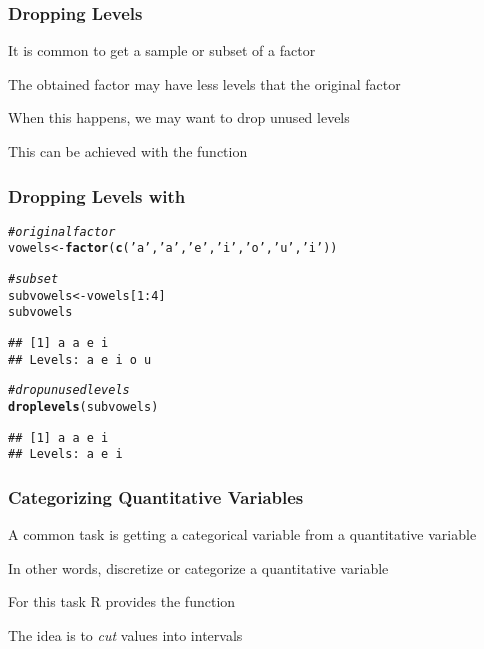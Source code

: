\documentclass[12pt]{beamer}\usepackage[]{graphicx}\usepackage[]{color}
\makeatletter
\newcommand{\hlnum}[1]{\textcolor[rgb]{0.686,0.059,0.569}{#1}}%
\newcommand{\hlstr}[1]{\textcolor[rgb]{0.192,0.494,0.8}{#1}}%
\newcommand{\hlcom}[1]{\textcolor[rgb]{0.678,0.584,0.686}{\textit{#1}}}%
\newcommand{\hlopt}[1]{\textcolor[rgb]{0,0,0}{#1}}%
\newcommand{\hlstd}[1]{\textcolor[rgb]{0.345,0.345,0.345}{#1}}%
\newcommand{\hlkwb}[1]{\textcolor[rgb]{0.69,0.353,0.396}{#1}}%
\newcommand{\hlkwd}[1]{\textcolor[rgb]{0.737,0.353,0.396}{\textbf{#1}}}%
\newenvironment{kframe}{%
 \def\at@end@of@kframe{}%
 \ifinner\ifhmode%
  \def\at@end@of@kframe{\end{minipage}}%
  \begin{minipage}{\columnwidth}%
 \fi\fi%
 \def\FrameCommand##1{\hskip\@totalleftmargin \hskip-\fboxsep
 \colorbox{shadecolor}{##1}\hskip-\fboxsep
     \hskip-\linewidth \hskip-\@totalleftmargin \hskip\columnwidth}%
 \MakeFramed {\advance\hsize-\width
   \@totalleftmargin\z@ \linewidth\hsize
   \@setminipage}}%
 {\par\unskip\endMakeFramed%
 \at@end@of@kframe}
\newenvironment{knitrout}{}{} %
\makeatother
\begin{document}

\begin{frame}[fragile]
\frametitle{Dropping Levels}

\bi
  \item It is common to get a sample or subset of a factor
  \item The obtained factor may have less levels that the original factor
  \item When this happens, we may want to drop unused levels
  \item This can be achieved with the function 
\ei

\end{frame}


\begin{frame}[fragile]
\frametitle{Dropping Levels with }

\begin{knitrout}\footnotesize
{}\color{fgcolor}\begin{kframe}
\begin{alltt}
\hlcom{# original factor}
\hlstd{vowels} \hlkwb{<-} \hlkwd{factor}\hlstd{(}\hlkwd{c}\hlstd{(}\hlstr{'a'}\hlstd{,} \hlstr{'a'}\hlstd{,} \hlstr{'e'}\hlstd{,} \hlstr{'i'}\hlstd{,} \hlstr{'o'}\hlstd{,} \hlstr{'u'}\hlstd{,} \hlstr{'i'}\hlstd{))}

\hlcom{# subset}
\hlstd{subvowels} \hlkwb{<-} \hlstd{vowels[}\hlnum{1}\hlopt{:}\hlnum{4}\hlstd{]}
\hlstd{subvowels}
\end{alltt}
\begin{verbatim}
## [1] a a e i
## Levels: a e i o u
\end{verbatim}
\begin{alltt}
\hlcom{# drop unused levels}
\hlkwd{droplevels}\hlstd{(subvowels)}
\end{alltt}
\begin{verbatim}
## [1] a a e i
## Levels: a e i
\end{verbatim}
\end{kframe}
\end{knitrout}

\end{frame}


\begin{frame}
\frametitle{Categorizing Quantitative Variables}

\bi
  \item A common task is getting a categorical variable from a quantitative variable
  \item In other words, discretize or categorize a quantitative variable
  \item For this task R provides the function 
  \item The idea is to \textit{cut} values into intervals
\ei

\end{frame}
\end{document}

